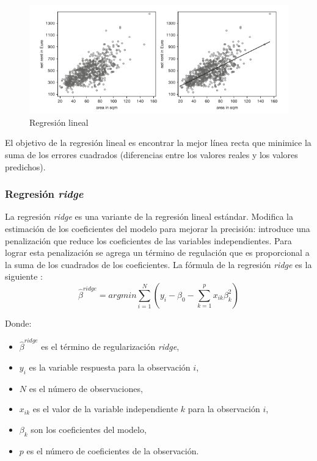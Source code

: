 \documentclass[12pt,a4paper]{article}
\begin{document}
\begin{figure}[H]
	\centering
	\includegraphics[width=0.7\linewidth]{figs/linear_regression}
	\caption{Regresión lineal \cite{fahrmeir2013regression}}
	\label{fig:linearregression}
\end{figure}
El objetivo de la regresión lineal es encontrar la mejor línea recta que minimice la suma de los errores cuadrados (diferencias entre los valores reales y los valores predichos).

\subsubsection{Regresión \textit{ridge}}
La regresión \textit{ridge} es una variante de la regresión lineal estándar. Modifica la estimación de los coeficientes del modelo para mejorar la precisión: introduce una penalización que reduce los coeficientes de las variables independientes. Para lograr esta penalización se agrega un término de regulación que es proporcional a la suma de los cuadrados de los coeficientes. La fórmula de la regresión \textit{ridge} es la siguiente \cite{hastie2009elements}:
\begin{equation}
	\hat{\beta}^{ridge} = argmin {\sum_{i=1}^{N}} (y_i - \beta_0 - \sum_{k=1}^{p}x_{ik}\beta^{2}_k)
\end{equation}

Donde:
\begin{itemize}
	\item $\hat{\beta}^{ridge}$ es el término de regularización \textit{ridge},
	\item $y_i$ es la variable respuesta para la observación $i$,
	\item $N$ es el número de observaciones,
	\item $x_{ik}$ es el valor de la variable independiente $k$ para la observación $i$,
	\item $\beta_{k}$ son los coeficientes del modelo,
	\item $p$ es el número de coeficientes de la observación.
\end{itemize}
\end{document}
